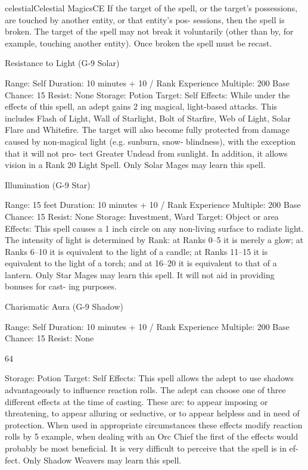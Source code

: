 \begin{College}[1.3]{celestial}{Celestial Magics}{CE}
If the target of the spell, or the target’s possessions, 
are  touched  by  another  entity,  or  that  entity’s  pos-
sessions, then the spell is broken. The target of the 
spell  may  not  break  it  voluntarily  (other  than  by, 
for example, touching another entity). Once broken 
the spell must be recast. 

Resistance to Light (G-9 Solar) 

Range: Self 
Duration: 10 minutes + 10 / Rank 
Experience Multiple: 200 
Base Chance: 15%
Resist: None 
Storage: Potion 
Target: Self 
Effects:  While  under  the  effects  of  this  spell,  an 
adept gains 2%
ing  magical,  light-based  attacks.  This  includes 
Flash  of  Light,  Wall  of  Starlight,  Bolt  of  Starfire, 
Web of Light, Solar Flare and Whitefire. The target 
will  also  become  fully  protected  from  damage 
caused  by  non-magical  light  (e.g.  sunburn,  snow-
blindness),  with  the  exception  that  it  will  not  pro-
tect  Greater  Undead  from  sunlight.  In  addition,  it 
allows vision in a Rank 20 Light Spell. Only Solar 
Mages may learn this spell. 

Illumination (G-9 Star) 

Range: 15 feet 
Duration: 10 minutes + 10 / Rank 
Experience Multiple: 200 
Base Chance: 15%
Resist: None 
Storage: Investment, Ward 
Target: Object or area 
Effects:  This  spell  causes  a  1  inch  circle  on  any 
non-living surface to radiate light. The intensity of 
light  is  determined  by  Rank:  at  Ranks  0–5  it  is 
merely a glow; at Ranks 6–10 it is equivalent to the 
light of a candle; at Ranks 11–15 it is equivalent to 
the light of a torch; and at 16–20 it is equivalent to 
that  of  a  lantern.  Only  Star  Mages  may  learn  this 
spell.  It  will not aid in providing bonuses for cast-
ing purposes. 

Charismatic Aura (G-9 Shadow) 

Range: Self 
Duration: 10 minutes + 10 / Rank 
Experience Multiple: 200 
Base Chance: 15%
Resist: None 

64 

Storage: Potion 
Target: Self 
Effects: This spell allows the adept to use shadows 
advantageously  to  influence  reaction  rolls.  The 
adept  can  choose  one  of  three  different  effects  at 
the  time  of  casting.  These  are:  to  appear  imposing 
or threatening, to appear alluring or seductive, or to 
appear  helpless  and  in  need  of  protection.  When 
used  in  appropriate  circumstances  these  effects 
modify  reaction  rolls  by  5%
example,  when dealing with an Orc Chief the first 
of the effects would probably be most beneficial. It 
is  very  difficult  to  perceive  that  the  spell  is  in  ef-
fect. Only Shadow Weavers may learn this spell. 


\end{College}
